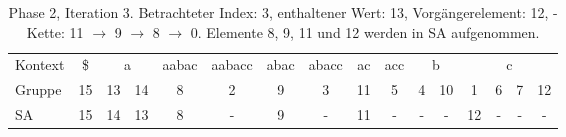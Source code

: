 \begin{table}[H]
\begin{adjustbox}{max width=\textwidth}
\begin{tabular}{lccccccccccccccc}
\multicolumn{1}{l|}{Kontext} & \multicolumn{1}{c|}{\$} & \multicolumn{2}{c|}{a}                               & \multicolumn{1}{c|}{aabac}                     & \multicolumn{1}{c|}{aabacc} & \multicolumn{1}{c|}{abac}                      & \multicolumn{1}{c|}{abacc} & \multicolumn{1}{c|}{ac}                         & \multicolumn{1}{c|}{acc} & \multicolumn{2}{c|}{b}       & \multicolumn{4}{c}{c}                     \\
\multicolumn{1}{l|}{Gruppe}  & \multicolumn{1}{c|}{15} & 13 & \multicolumn{1}{c|}{14}                         & \multicolumn{1}{c|}{8}                         & \multicolumn{1}{c|}{2}      & \multicolumn{1}{c|}{9}                         & \multicolumn{1}{c|}{3}     & \multicolumn{1}{c|}{11}                         & \multicolumn{1}{c|}{5}   & 4  & \multicolumn{1}{c|}{10} & 1                          & 6  & 7  & 12 \\
\multicolumn{1}{l|}{SA}      & \multicolumn{1}{c|}{15} & 14 & \multicolumn{1}{c|}{\cellcolor[HTML]{\green}13} & \multicolumn{1}{c|}{\cellcolor[HTML]{\red}8} & \multicolumn{1}{c|}{-}      & \multicolumn{1}{c|}{\cellcolor[HTML]{\red}9} & \multicolumn{1}{c|}{-}     & \multicolumn{1}{c|}{\cellcolor[HTML]{\red}11} & \multicolumn{1}{c|}{-}   & -  & \multicolumn{1}{c|}{-}  & \cellcolor[HTML]{\red}12 & -  & -  & - 
\end{tabular}
\end{adjustbox}

\caption[Phase 2, Iteration 3]{Phase 2, Iteration 3. Betrachteter Index: 3, enthaltener Wert: 13, Vorgängerelement: 12, \prevpointer-Kette: 11 $\rightarrow$ 9 $\rightarrow$ 8 $\rightarrow$ 0. Elemente 8, 9, 11 und 12 werden in SA aufgenommen.}
\label{table_complex_example_2_3} 
\end{table}

